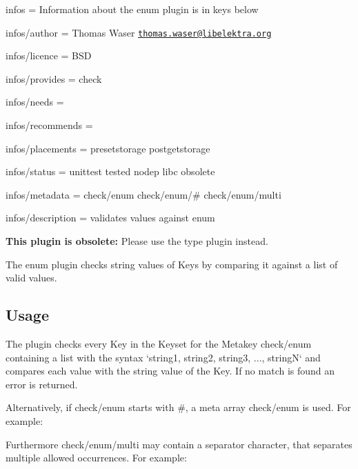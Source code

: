 
\begin{DoxyItemize}
\item infos = Information about the enum plugin is in keys below
\item infos/author = Thomas Waser \href{mailto:thomas.waser@libelektra.org}{\tt thomas.\+waser@libelektra.\+org}
\item infos/licence = B\+SD
\item infos/provides = check
\item infos/needs =
\item infos/recommends =
\item infos/placements = presetstorage postgetstorage
\item infos/status = unittest tested nodep libc obsolete
\item infos/metadata = check/enum check/enum/\# check/enum/multi
\item infos/description = validates values against enum
\end{DoxyItemize}

{\bfseries This plugin is obsolete\+:} Please use the {\ttfamily type} plugin instead.

The enum plugin checks string values of Keys by comparing it against a list of valid values.

\subsection*{Usage}

The plugin checks every Key in the Keyset for the Metakey {\ttfamily check/enum} containing a list with the syntax `\textquotesingle{}string1\textquotesingle{}, \textquotesingle{}string2\textquotesingle{}, \textquotesingle{}string3\textquotesingle{}, ..., \textquotesingle{}stringN\textquotesingle{}` and compares each value with the string value of the Key. If no match is found an error is returned.

Alternatively, if {\ttfamily check/enum} starts with {\ttfamily \#}, a meta array {\ttfamily check/enum} is used. For example\+:




Furthermore {\ttfamily check/enum/multi} may contain a separator character, that separates multiple allowed occurrences. For example\+:



